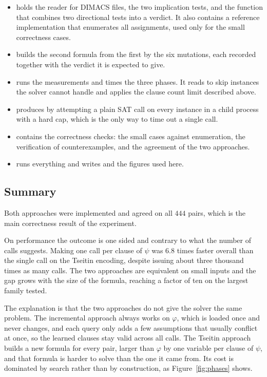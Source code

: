 \documentclass[11pt,a4paper]{article}
\begin{document}
\begin{itemize}
  \item {} holds the reader for DIMACS files, the two
  implication tests, and the function that combines two directional tests into
  a verdict. It also contains a reference implementation that enumerates all
  assignments, used only for the small correctness cases.

  \item {} builds the second formula from the first by the six
  mutations, each recorded together with the verdict it is expected to give.

  \item {} runs the measurements and times the three phases. It
  reads  to skip instances the solver cannot handle and
  applies the clause count limit described above.

  \item {} produces  by attempting a plain SAT
  call on every instance in a child process with a hard cap, which is the only
  way to time out a single call.

  \item {} contains the correctness checks: the small
  cases against enumeration, the verification of counterexamples, and the
  agreement of the two approaches.

  \item {} runs everything and writes 
  and the figures used here.
\end{itemize}

\subsection*{Summary}

Both approaches were implemented and agreed on all $444$ pairs, which is the
main correctness result of the experiment.

On performance the outcome is one sided and contrary to what the number of
calls suggests. Making one call per clause of $\psi$ was $6.8$ times faster
overall than the single call on the Tseitin encoding, despite issuing about
three thousand times as many calls. The two approaches are equivalent on small
inputs and the gap grows with the size of the formula, reaching a factor of
ten on the largest family tested.

The explanation is that the two approaches do not give the solver the same
problem. The incremental approach always works on $\varphi$, which is loaded
once and never changes, and each query only adds a few assumptions that
usually conflict at once, so the learned clauses stay valid across all calls.
The Tseitin approach builds a new formula for every pair, larger than
$\varphi$ by one variable per clause of $\psi$, and that formula is harder to
solve than the one it came from. Its cost is dominated by search rather than
by construction, as Figure~\ref{fig:phases} shows.
\end{document}
